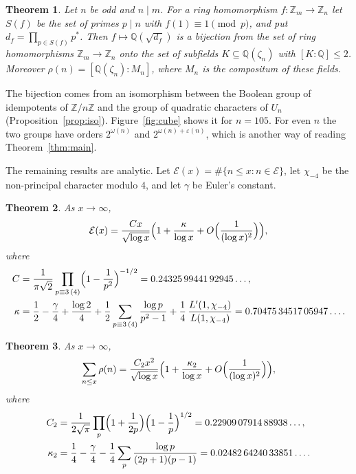 \documentclass[11pt]{article}
\newtheorem{theorem}{Theorem}[section]
\theoremstyle{definition}
\newcommand{\Z}{\mathbb{Z}}
\newcommand{\Q}{\mathbb{Q}}
\newcommand{\E}{\mathcal{E}}
\renewcommand{\epsilon}{\varepsilon}
\begin{document}
\begin{theorem}\label{thm:galois}
Let $n$ be odd and $n\mid m$. For a ring homomorphism $f\colon\Z_m\to\Z_n$ let $S(f)$ be the set of primes $p\mid n$ with $f(1)\equiv1\pmod p$, and put $d_f=\prod_{p\in S(f)}p^*$. Then $f\mapsto\Q(\sqrt{d_f})$ is a bijection from the set of ring homomorphisms $\Z_m\to\Z_n$ onto the set of subfields $K\subseteq\Q(\zeta_n)$ with $[K:\Q]\le2$. Moreover $\rho(n)=[\Q(\zeta_n):M_n]$, where $M_n$ is the compositum of these fields.
\end{theorem}

The bijection comes from an isomorphism between the Boolean group of idempotents of $\Z/n\Z$ and the group of quadratic characters of $U_n$ (Proposition~\ref{prop:iso}). Figure~\ref{fig:cube} shows it for $n=105$. For even $n$ the two groups have orders $2^{\omega(n)}$ and $2^{\omega(n)+\epsilon(n)}$, which is another way of reading Theorem~\ref{thm:main}.

The remaining results are analytic. Let $\E(x)=\#\{n\le x:n\in\E\}$, let $\chi_{-4}$ be the non-principal character modulo $4$, and let $\gamma$ be Euler's constant.

\begin{theorem}\label{thm:exc}
As $x\to\infty$,
\[
  \E(x)=\frac{Cx}{\sqrt{\log x}}\Bigl(1+\frac{\kappa}{\log x}+O\Bigl(\frac{1}{(\log x)^2}\Bigr)\Bigr),
\]
where
\begin{align*}
  C&=\frac{1}{\pi\sqrt2}\prod_{p\equiv3\,(4)}\Bigl(1-\frac1{p^2}\Bigr)^{-1/2}=0.24325\,99441\,92945\ldots,\\
  \kappa&=\frac12-\frac{\gamma}{4}+\frac{\log2}{4}+\frac12\sum_{p\equiv3\,(4)}\frac{\log p}{p^2-1}+\frac14\,\frac{L'(1,\chi_{-4})}{L(1,\chi_{-4})}=0.70475\,34517\,05947\ldots .
\end{align*}
\end{theorem}

\begin{theorem}\label{thm:mean}
As $x\to\infty$,
\[
  \sum_{n\le x}\rho(n)=\frac{C_2x^2}{\sqrt{\log x}}\Bigl(1+\frac{\kappa_2}{\log x}+O\Bigl(\frac{1}{(\log x)^2}\Bigr)\Bigr),
\]
where
\begin{align*}
  C_2&=\frac{1}{2\sqrt\pi}\prod_{p}\Bigl(1+\frac1{2p}\Bigr)\Bigl(1-\frac1p\Bigr)^{1/2}=0.22909\,07914\,88938\ldots,\\
  \kappa_2&=\frac14-\frac{\gamma}{4}-\frac14\sum_{p}\frac{\log p}{(2p+1)(p-1)}=0.02482\,64240\,33851\ldots .
\end{align*}
\end{theorem}
\end{document}
